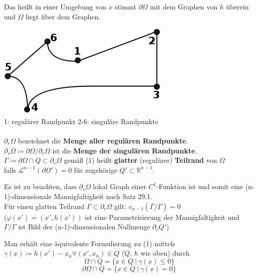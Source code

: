 \begin{definition}
    Das heißt in einer Umgebung von $x$ stimmt $\partial \Omega $ mit dem Graphen von $h$
    überein und $\Omega$ liegt über dem Graphen.
    
    \includegraphics[scale=0.5]{pictures/007-02a}\\
    1: regulärer Randpunkt
    2-6: singuläre Randpunkte\\
    \mbox{}\\
    $\partial_r \Omega $ bezeichnet die \textbf{Menge aller regulären Randpunkte}. \\
    $\partial_s \Omega \coloneqq \partial \Omega / \partial_r \Omega $ ist die 
    \textbf{Menge der singulären Randpunkte}. \\
    $\Gamma \coloneqq \partial \Omega \cap Q \subset \partial_r \Omega $
    gemäß (1) heißt \textbf{glatter} (regulärer) \textbf{Teilrand} von $\Omega$ \\
    falls $\mathcal{L}^{n-1} (\partial \Omega') = 0 $
    für zugehörige $Q' \subset \mathbb{R}^{n-1} $.
\end{definition}    
    
Es ist zu beachten, dass $\partial_r \Omega $ lokal Graph einer
$C^1$-Funktion ist und somit eine (n-1)-dimensionale Mannigfaltigkeit nach Satz 29.1. \\
Für einen glatten Teilrand $\Gamma \subset \partial_r \Omega $ gilt:
$v_{n-1} \left(\overline{\Gamma} / \Gamma \right) = 0 $\\
($\varphi \left(x' \right) = \left(x', h\left(x' \right) \right)
$ ist eine Parametrisierung der Mannigfaltigkeit und \\
$\overline{\Gamma} / \Gamma 
$ ist Bild der (n-1)-dimensionalen Nullmenge $
\partial_r Q' $)

Man erhält eine äquivalente Formulierung zu (1) mittels \\
$\gamma(x) \coloneqq h(x') - x_n \forall (x', x_n) \in Q $ ($Q$, $h$ wie oben) durch
\begin{equation*}
    \Omega \cap Q = \lbrace x \in Q \ |\ \gamma(x) \leq 0 \rbrace
\end{equation*}
\begin{equation}
    \partial \Omega \cap Q = \lbrace x \in Q \ |\ \gamma(x) = 0 \rbrace
\end{equation}

